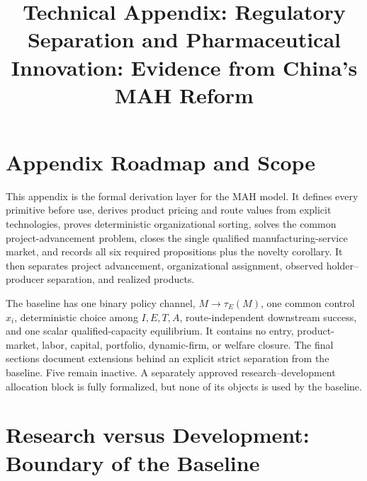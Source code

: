 \documentclass[11pt]{article}
\title{Technical Appendix: Regulatory Separation and Pharmaceutical Innovation: Evidence from China's MAH Reform}
\author{}
\date{}
\newcommand{\1}{\mathbf{1}}
\begin{document}
\maketitle
\thispagestyle{plain}

\newpage
\tableofcontents
\newpage
\small

\section{Appendix Roadmap and Scope}
\label{sec:appendix-roadmap}

This appendix is the formal derivation layer for the MAH model. It
defines every primitive before use, derives product pricing and route values
from explicit technologies, proves deterministic organizational sorting,
solves the common project-advancement problem, closes the single qualified
manufacturing-service market, and records all six required propositions plus
the novelty corollary. It then separates project advancement, organizational
assignment, observed holder--producer separation, and realized products.

The baseline has one binary policy channel, \(M\to\tau_E(M)\), one common
control \(x_i\), deterministic choice among \(I,E,T,A\), route-independent
downstream success, and one scalar qualified-capacity equilibrium. It contains
no entry, product-market, labor, capital, portfolio, dynamic-firm, or welfare
closure. The final sections document extensions behind an explicit strict
separation from the baseline. Five remain inactive. A separately approved
research--development allocation block is fully formalized, but none of its
objects is used by the baseline.












\section{Research versus Development: Boundary of the Baseline}
\label{sec:appendix-research-development-boundary}
\end{document}
